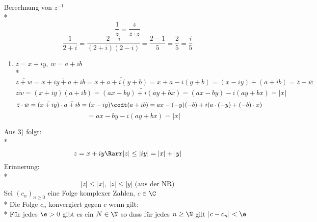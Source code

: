 


Berechnung von $z^{-1}$\\*
$$\frac{1}{z} = \frac{z}{\bar{z} \cdot z}$$ %
$$\frac{1}{2+i} = \frac{2 - i}{(2+i)(2-i)} = \frac{2-1}{5} = \frac{2}{5} = \frac{i}{5}$$
\bew
\begin{enumerate}
\item{$z = x+iy,\ w = a + ib$\\*
$$\bar{z+w} = \bar{x+iy + a + ib} = \bar{x+a + i(y+b)} = x + a - i(y + b) = (x - iy)+(a + ib) = \bar{z} + \bar{w}$$
$$\bar{zw} = \bar{(x+iy)(a + ib) = \bar{(ax - by) + i(ay + bx)} = (ax - by) - i(ay + bx) = |x|}$$
$$\bar{z} \cdot \bar{w} = \bar{(x+iy)} \cdot \bar{a+ib} = (x-iy) \codt (a+ib) = ax - (-y)(-b) + i(a\cdot (-y) + (-b) \cdot x)$$
$$= ax - by -i(ay + bx) =  |x|$$}
\end{enumerate}

\bem
Aus 3) folgt: \\*
$$z = x+iy \Rarr |z| \leq |iy| = |x| + |y|$$
Erinnerung:\\*
$$|z| \leq |x|,\ |z| \leq |y| \text{ (aus der NR)}$$
Sei $(c_n)_{n\geq 0}$ eine Folge komplexer Zahlen, $c \in \C$\\*
Die Folge $c_n$ konvergiert gegen $c$ wenn gilt:\\*
Für jedes $\e > 0$ gibt es ein $N \in \N$ so dass für jedes $n \geq \N$ gilt $|c - c_n| < \e$

